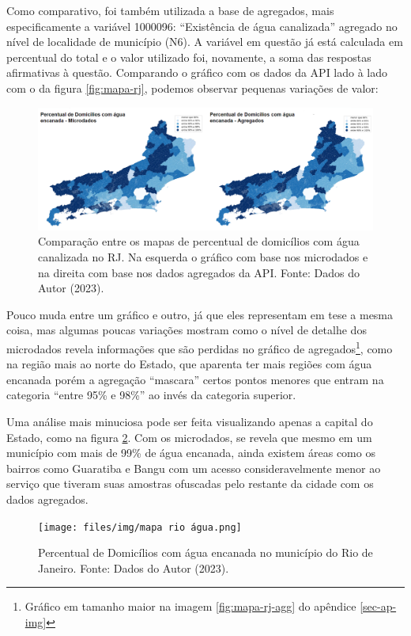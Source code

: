     Como comparativo, foi também utilizada a base de agregados, mais especificamente a variável 1000096: ``Existência de água canalizada'' agregado no nível de localidade de município (N6). A variável em questão já está calculada em percentual do total e o valor utilizado foi, novamente, a soma das respostas afirmativas à questão. Comparando o gráfico com os dados da API lado à lado com o da figura \ref{fig:mapa-rj}, podemos observar pequenas variações de valor:

\begin{figure}[ht]
    \centering
    \includegraphics[width=\textwidth]{files/img/mapa rj agua.png}
    \caption{Comparação entre os mapas de percentual de domicílios com água canalizada no RJ. Na esquerda o gráfico com base nos microdados e na direita com base nos dados agregados da API. Fonte: Dados do Autor (2023).}
    \label{fig:mapa-rj-compara}
\end{figure}

    Pouco muda entre um gráfico e outro, já que eles representam em tese a mesma coisa, mas algumas poucas variações mostram como o nível de detalhe dos microdados revela informações que são perdidas no gráfico de agregados\footnote{Gráfico em tamanho maior na imagem \ref{fig:mapa-rj-agg} do apêndice \ref{sec-ap-img}}, como na região mais ao norte do Estado, que aparenta ter mais regiões com água encanada porém a agregação ``mascara'' certos pontos menores que entram na categoria ``entre 95\% e 98\%'' ao invés da categoria superior.
    
    Uma análise mais minuciosa pode ser feita visualizando apenas a capital do Estado, como na figura \ref{fig:mapa-mun-rio}. Com os microdados, se revela que mesmo em um município com mais de 99\% de água encanada, ainda existem áreas como os bairros como Guaratiba e Bangu com um acesso consideravelmente menor ao serviço que tiveram suas amostras ofuscadas pelo restante da cidade com os dados agregados.

\begin{figure}[ht]
    \centering
    \texttt{[image: files/img/mapa rio água.png]}
    \caption{Percentual de Domicílios com água encanada no município do Rio de Janeiro. Fonte: Dados do Autor (2023).}
    \label{fig:mapa-mun-rio}
\end{figure}
